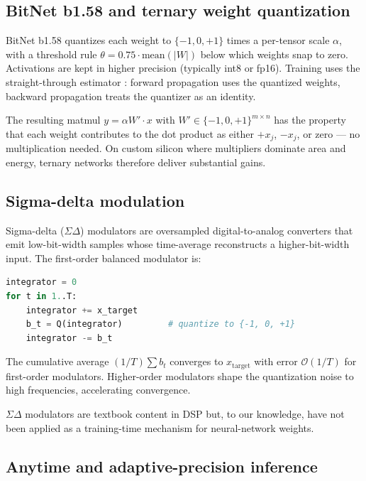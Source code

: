 \documentclass[11pt]{article}
\begin{document}
\subsection{BitNet b1.58 and ternary weight quantization}

BitNet b1.58 \citep{ma2024bitnet} quantizes each weight to
$\{-1, 0, +1\}$ times a per-tensor scale $\alpha$, with a threshold
rule $\theta = 0.75\cdot\text{mean}(|W|)$ below which weights snap
to zero. Activations are kept in higher precision (typically int8 or
fp16). Training uses the straight-through estimator
\citep{bengio2013ste}: forward propagation uses the quantized weights,
backward propagation treats the quantizer as an identity.

The resulting matmul $y = \alpha W' \cdot x$ with $W' \in
\{-1, 0, +1\}^{m \times n}$ has the property that each weight
contributes to the dot product as either $+x_j$, $-x_j$, or zero ---
no multiplication needed. On custom silicon where multipliers dominate
area and energy, ternary networks therefore deliver substantial gains.

\subsection{Sigma-delta modulation}

Sigma-delta ($\Sigma\Delta$) modulators \citep{schreier2004dsd} are
oversampled digital-to-analog converters that emit low-bit-width
samples whose time-average reconstructs a higher-bit-width input. The
first-order balanced modulator is:

\begin{lstlisting}[language=Python]
integrator = 0
for t in 1..T:
    integrator += x_target
    b_t = Q(integrator)         # quantize to {-1, 0, +1}
    integrator -= b_t
\end{lstlisting}

The cumulative average $(1/T)\sum b_t$ converges to $x_{\text{target}}$
with error $\mathcal{O}(1/T)$ for first-order modulators. Higher-order
modulators shape the quantization noise to high frequencies,
accelerating convergence.

$\Sigma\Delta$ modulators are textbook content in DSP but, to our
knowledge, have not been applied as a training-time mechanism for
neural-network weights.

\subsection{Anytime and adaptive-precision inference}
\end{document}
